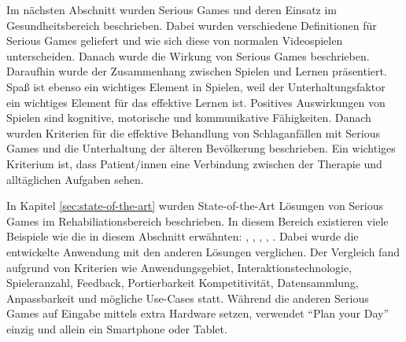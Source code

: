 Im nächsten Abschnitt wurden Serious Games und deren Einsatz im Gesundheitsbereich beschrieben. Dabei wurden verschiedene Definitionen für Serious Games geliefert und wie sich diese von normalen Videospielen unterscheiden. Danach wurde die Wirkung von Serious Games beschrieben. Daraufhin wurde der Zusammenhang zwischen Spielen und Lernen präsentiert. Spaß ist ebenso ein wichtiges Element in Spielen, weil der Unterhaltungsfaktor ein wichtiges Element für das effektive Lernen ist. Positives Auswirkungen von Spielen sind kognitive, motorische und kommunikative Fähigkeiten. Danach wurden Kriterien für die effektive Behandlung von Schlaganfällen mit Serious Games und die Unterhaltung der älteren Bevölkerung beschrieben. Ein wichtiges Kriterium ist, dass Patient/innen eine Verbindung zwischen der Therapie und alltäglichen Aufgaben sehen.

In Kapitel \ref{sec:state-of-the-art} wurden State-of-the-Art Lösungen von Serious Games im Rehabiliationsbereich beschrieben. In diesem Bereich existieren viele Beispiele wie die in diesem Abschnitt erwähnten: , , , , . Dabei wurde die entwickelte Anwendung mit den anderen Lösungen verglichen. Der Vergleich fand aufgrund von Kriterien wie Anwendungsgebiet, Interaktionstechnologie, Spieleranzahl, Feedback, Portierbarkeit Kompetitivität, Datensammlung, Anpassbarkeit und mögliche Use-Cases statt. Während die anderen Serious Games auf Eingabe mittels extra Hardware setzen, verwendet \enquote{Plan your Day} einzig und allein ein Smartphone oder Tablet.

